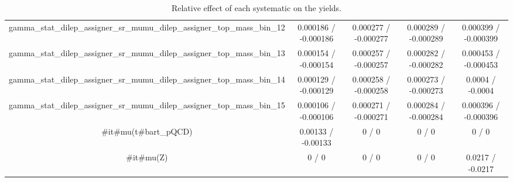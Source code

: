 \documentclass[10pt]{article}
\begin{document}
\begin{table}[htbp]
\begin{center}
\begin{tabular}{|c|c|c|c|c|}
  gamma_stat_dilep_assigner_sr_mumu_dilep_assigner_top_mass_bin_12 & 0.000186 / -0.000186 & 0.000277 / -0.000277 & 0.000289 / -0.000289 & 0.000399 / -0.000399 \\ 
  gamma_stat_dilep_assigner_sr_mumu_dilep_assigner_top_mass_bin_13 & 0.000154 / -0.000154 & 0.000257 / -0.000257 & 0.000282 / -0.000282 & 0.000453 / -0.000453 \\ 
  gamma_stat_dilep_assigner_sr_mumu_dilep_assigner_top_mass_bin_14 & 0.000129 / -0.000129 & 0.000258 / -0.000258 & 0.000273 / -0.000273 & 0.0004 / -0.0004 \\ 
  gamma_stat_dilep_assigner_sr_mumu_dilep_assigner_top_mass_bin_15 & 0.000106 / -0.000106 & 0.000271 / -0.000271 & 0.000284 / -0.000284 & 0.000396 / -0.000396 \\ 
  #it{#mu}(t#bar{t}_{pQCD}) & 0.00133 / -0.00133 & 0 / 0 & 0 / 0 & 0 / 0 \\ 
  #it{#mu}(Z) & 0 / 0 & 0 / 0 & 0 / 0 & 0.0217 / -0.0217 \\ 
\hline 
\end{tabular} 
\caption{Relative effect of each systematic on the yields.} 
\end{center} 
\end{table} 
\end{document}
